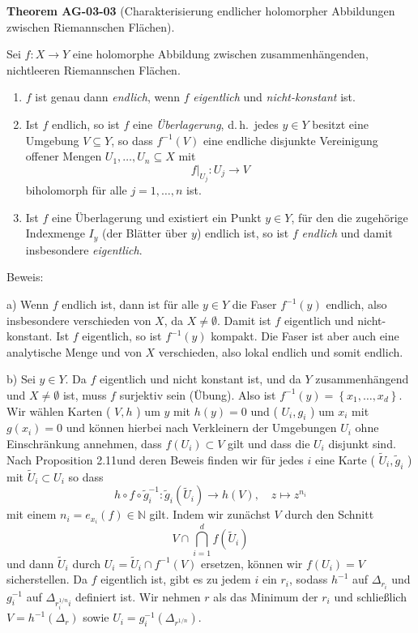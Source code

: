 \documentclass[10pt, letterpaper]{article}
\newcommand{\CustomHeading}[3]{%
  \par\medskip\noindent%
  \textbf{#1 #2} \textnormal{(#3)}.\enskip%
}
\newenvironment{THEO}[2]{\begin{unitbox}\CustomHeading{Theorem}{#1}{#2}}{\end{unitbox}}
\begin{document}
\begin{THEO}{AG-03-03}{Charakterisierung endlicher holomorpher Abbildungen zwischen Riemannschen Flächen}
Sei \(f:X\to Y\) eine holomorphe Abbildung zwischen zusammenhängenden,
nichtleeren Riemannschen Flächen.

\begin{enumerate}[label=\textbf{(\alph*)}]
\item
\(f\) ist genau dann \emph{endlich}, wenn \(f\) \emph{eigentlich} und
\emph{nicht-konstant} ist.

\item
Ist \(f\) endlich, so ist \(f\) eine \emph{Überlagerung}, d.\,h.\
jedes \(y\in Y\) besitzt eine Umgebung \(V\subseteq Y\), so dass
\(f^{-1}(V)\) eine endliche disjunkte Vereinigung offener Mengen
\(U_1,\dots,U_n\subseteq X\) mit
\[
f|_{U_j}:U_j\longrightarrow V
\]
biholomorph für alle \(j=1,\dots,n\) ist.

\item
Ist \(f\) eine Überlagerung und existiert ein Punkt \(y\in Y\),
für den die zugehörige Indexmenge \(I_y\) (der Blätter über \(y\))
endlich ist, so ist \(f\) \emph{endlich} und damit insbesondere \emph{eigentlich}.
\end{enumerate}
\end{THEO}

Beweis: 

a) Wenn $f$ endlich ist, dann ist für alle $y \in Y$ die Faser $f^{-1}(y)$ endlich, also insbesondere verschieden von $X$, da $X \neq \emptyset$. Damit ist $f$ eigentlich und nicht-konstant. Ist $f$ eigentlich, so ist $f^{-1}(y)$ kompakt. Die Faser ist aber auch eine analytische Menge und von $X$ verschieden, also lokal endlich und somit endlich.

b) Sei $y \in Y$. Da $f$ eigentlich und nicht konstant ist, und da $Y$ zusammenhängend und $X \neq \emptyset$ ist, muss $f$ surjektiv sein (Übung). Also ist $f^{-1}(y)= \left\{x_{1}, \ldots, x_{d}\right\}$. Wir wählen Karten ( $V, h$ ) um $y$ mit $h(y)=0$ und ( $U_{i}, g_{i}$ ) um $x_{i}$ mit $g\left(x_{i}\right)=0$ und können hierbei nach Verkleinern der Umgebungen $U_{i}$ ohne Einschränkung annehmen, dass $f\left(U_{i}\right) \subset V$ gilt und dass die $U_{i}$ disjunkt sind. Nach Proposition 2.11und deren Beweis finden wir für jedes $i$ eine Karte ( $\widetilde{U}_{i}, \widetilde{g}_{i}$ ) mit $\widetilde{U}_{i} \subset U_{i}$ so dass
$$
h \circ f \circ \widetilde{g}_{i}^{-1}: \widetilde{g}_{i}\left(\widetilde{U}_{i}\right) \rightarrow h(V), \quad z \mapsto z^{n_{i}}
$$
mit einem $n_{i}=e_{x_{i}}(f) \in \mathbb{N}$ gilt. Indem wir zunächst $V$ durch den Schnitt 
$$V \cap \bigcap_{i=1}^{d} f\left(\widetilde{U}_{i}\right)$$ 
und dann $\widetilde{U}_{i}$ durch $U_{i}=\widetilde{U}_{i} \cap f^{-1}(V)$ ersetzen, können wir $f\left(U_{i}\right)=V$ sicherstellen. Da $f$ eigentlich ist, gibt es zu jedem $i$ ein $r_{i}$, sodass $h^{-1}$ auf $\Delta_{r_{i}}$ und $g_{i}^{-1}$ auf $\Delta_{r_{i}^{1 / n} i}$ definiert ist. Wir nehmen $r$ als das Minimum der $r_{i}$ und schließlich $V=h^{-1}\left(\Delta_{r}\right)$ sowie $U_{i}=g_{i}^{-1}\left(\Delta_{r^{1 / n}}\right)$.
\end{document}
